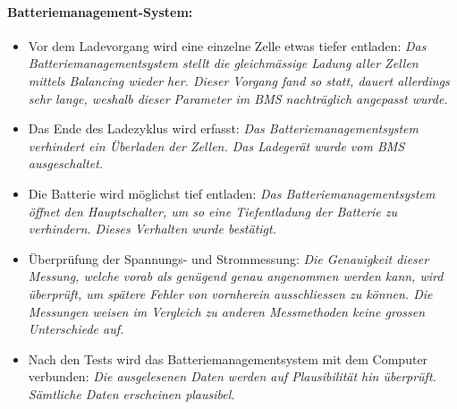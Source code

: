 \paragraph{Batteriemanagement-System:} \begin{itemize}
	\item Vor dem Ladevorgang wird eine einzelne Zelle etwas tiefer entladen: \textit{Das Batteriemanagementsystem stellt die gleichmässige Ladung aller Zellen mittels Balancing wieder her. Dieser Vorgang fand so statt, dauert allerdings sehr lange, weshalb dieser Parameter im BMS nachträglich angepasst wurde.}
	\item Das Ende des Ladezyklus wird erfasst: \textit{Das Batteriemanagementsystem verhindert ein Überladen der Zellen. Das Ladegerät wurde vom BMS ausgeschaltet.}
	\item Die Batterie wird möglichst tief entladen: \textit{Das Batteriemanagementsystem öffnet den Hauptschalter, um so eine Tiefentladung der Batterie zu verhindern. Dieses Verhalten wurde bestätigt.}
	\item Überprüfung der Spannungs- und Strommessung: \textit{Die Genauigkeit dieser Messung, welche vorab als genügend genau angenommen werden kann, wird überprüft, um spätere Fehler von vornherein ausschliessen zu können. Die Messungen weisen im Vergleich zu anderen Messmethoden keine grossen Unterschiede auf.}
	\item Nach den Tests wird das Batteriemanagementsystem mit dem Computer verbunden: \textit{Die ausgelesenen Daten werden auf Plausibilität hin überprüft. Sämtliche Daten erscheinen plausibel.}
\end{itemize}\color{black}


\newpage